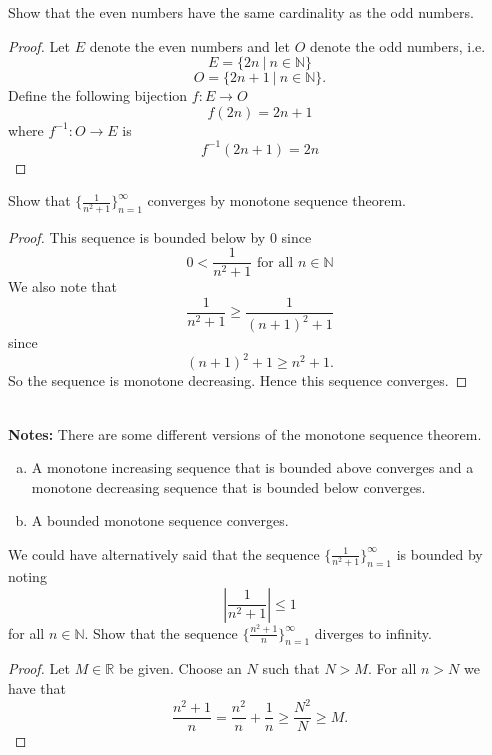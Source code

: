 \documentclass[11pt]{exam}
\theoremstyle{definition}
\begin{document}
\begin{questions}
\vspace{1.5in}
\newpage 
\question Show that the even numbers have the same cardinality as the odd numbers.  
\begin{proof}
Let $E$ denote the even numbers and let $O$ denote the odd numbers, i.e. 
\[E=\{2n\ |\ n\in \mathbb{N}\}\]
\[O=\{2n+1\ |\ n\in \mathbb{N}\}.\]
Define the following bijection $f:E\rightarrow O$
\[f(2n)=2n+1\]
where $f^{-1}:O\rightarrow E$ is 
\[f^{-1}(2n+1)=2n\]
\end{proof}
\newpage
\question Show that $\{\frac{1}{n^2+1}\}_{n=1}^\infty$ converges by monotone sequence theorem. 
\begin{proof}
This sequence is bounded below by $0$ since 
\[0< \frac{1}{n^2+1} \text{ for all }n\in\mathbb{N}\]
We also note that 
\[\frac{1}{n^2+1}\geq \frac{1}{(n+1)^2+1}\]
since 
\[(n+1)^2+1\geq n^2+1.\]
So the sequence is monotone decreasing. Hence this sequence converges. 
\end{proof}
\ \\
{\bf Notes: } There are some different versions of the monotone sequence theorem. 

\begin{enumerate}[(a)]
\item A monotone increasing sequence that is bounded above converges and a monotone decreasing sequence that is bounded below converges. 

\item A bounded monotone sequence converges. 
\end{enumerate}

We could have alternatively said that the sequence $\{\frac{1}{n^2+1}\}_{n=1}^\infty$ is bounded by noting 
\[\left|\frac{1}{n^2+1}\right|\leq 1\]
for all $n\in\mathbb{N}$.
\newpage
\question Show that the sequence $\{\frac{n^2+1}{n}\}_{n=1}^\infty$ diverges to infinity.
\begin{proof}
Let $M\in \mathbb{R}$ be given. Choose an $N$ such that $N>M$. For all $n>N$ we have that 
\[\frac{n^2+1}{n}=\frac{n^2}{n}+\frac{1}{n}\geq \frac{N^2}{N}\geq M.\]
\end{proof}
\end{questions}
\end{document}
